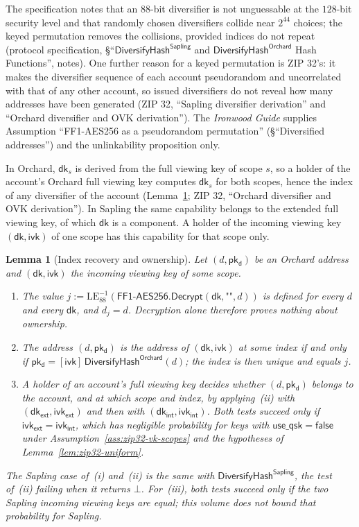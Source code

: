 \documentclass[11pt,a4paper]{article}
\newtheorem{lemma}[theorem]{Lemma}
\theoremstyle{definition}
\newcommand{\ivk}{\ensuremath{\mathsf{ivk}}}
\newcommand{\dk}{\ensuremath{\mathsf{dk}}}
\newcommand{\pkd}{\ensuremath{\mathsf{pk_d}}}
\begin{document}
The specification notes that an $88$-bit diversifier is not unguessable at
the $128$-bit security level and that randomly chosen diversifiers collide
near $2^{44}$ choices; the keyed permutation removes the collisions, provided
indices do not repeat (protocol specification,
\S``$\mathsf{DiversifyHash}^{\mathsf{Sapling}}$ and
$\mathsf{DiversifyHash}^{\mathsf{Orchard}}$ Hash Functions'', notes). One
further reason for a keyed permutation is ZIP 32's: it makes the diversifier
sequence of each account pseudorandom and uncorrelated with that of any other
account, so issued diversifiers do not reveal how many addresses have been
generated (ZIP 32, ``Sapling diversifier derivation'' and ``Orchard diversifier
and OVK derivation''). The \emph{Ironwood Guide} supplies Assumption
``FF1-AES256 as a pseudorandom permutation'' (\S``Diversified addresses'') and
the unlinkability proposition only.

In Orchard, $\dk_s$ is derived from the full viewing key of scope $s$, so a
holder of the account's Orchard full viewing key computes $\dk_s$ for both
scopes, hence the index of any diversifier of the account
(Lemma~\ref{lem:addr-ownership}; ZIP 32, ``Orchard diversifier and OVK
derivation''). In Sapling the same capability belongs to the extended full
viewing key, of which $\dk$ is a component. A holder of the incoming viewing
key $(\dk, \ivk)$ of one scope has this capability for that scope only.

\begin{lemma}[Index recovery and ownership]\label{lem:addr-ownership}
Let $(d, \pkd)$ be an Orchard address and $(\dk, \ivk)$ the incoming viewing
key of some scope.
\begin{enumerate}[label=(\roman*)]
\item The value $j := \mathrm{LE}_{88}^{-1}(\mathsf{FF1\text{-}AES256.
  Decrypt}(\dk, \texttt{""}, d))$ is defined for every $d$ and every $\dk$,
  and $d_j = d$. Decryption alone therefore proves nothing about ownership.
\item The address $(d, \pkd)$ is the address of $(\dk, \ivk)$ at some index
  if and only if $\pkd = [\ivk]\,\mathsf{DiversifyHash}^{\mathsf{Orchard}}(d)$;
  the index is then unique and equals $j$.
\item A holder of an account's full viewing key decides whether $(d, \pkd)$
  belongs to the account, and at which scope and index, by applying~(ii)
  with $(\dk_{\mathsf{ext}}, \ivk_{\mathsf{ext}})$ and then with
  $(\dk_{\mathsf{int}}, \ivk_{\mathsf{int}})$. Both tests succeed only if
  $\ivk_{\mathsf{ext}} = \ivk_{\mathsf{int}}$, which has negligible
  probability for keys with $\mathsf{use\_qsk} = \mathsf{false}$ under
  Assumption~\ref{ass:zip32-vk-scopes} and the hypotheses of
  Lemma~\ref{lem:zip32-uniform}.
\end{enumerate}
The Sapling case of~(i) and~(ii) is the same with
$\mathsf{DiversifyHash}^{\mathsf{Sapling}}$, the test of~(ii) failing when it
returns $\bot$. For~(iii), both tests succeed only if the two Sapling incoming
viewing keys are equal; this volume does not bound that probability for
Sapling.
\end{lemma}
\end{document}
